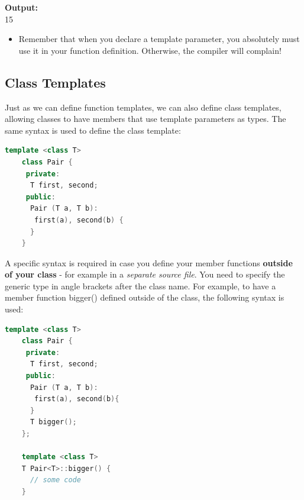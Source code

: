\documentclass[12pt , a4paper]{article}
\begin{document}
	\begin{tcolorbox}
	\textbf{Output:}\\
	15
	\end{tcolorbox}


	\begin{importantBox}

		\begin{itemize}
			\item Remember that when you declare a template parameter, you absolutely must use it in your function definition. Otherwise, the compiler will complain!
		\end{itemize}
	\end{importantBox}
	\subsection{Class Templates}
	Just as we can define function templates, we can also define class templates, allowing classes to have members that use template parameters as types.
	The same syntax is used to define the class template:
	\begin{lstlisting}[language=C++]
	template <class T>
	class Pair {
	 private:
	  T first, second;
	 public:
	  Pair (T a, T b):
	   first(a), second(b) {
	  }
	}		
	\end{lstlisting}
A specific syntax is required in case you define your member functions \textbf{outside of your class} - for example in a \emph{separate source file}.
You need to specify the generic type in angle brackets after the class name.
For example, to have a member function bigger() defined outside of the class, the following syntax is used:\\

	\begin{lstlisting}[language=C++]
	template <class T>
	class Pair {
	 private:
	  T first, second;
	 public:
	  Pair (T a, T b):
	   first(a), second(b){
	  }
	  T bigger();
	};
	
	template <class T>
	T Pair<T>::bigger() {
	  ​// some code
	}
		
	\end{lstlisting}
\end{document}

